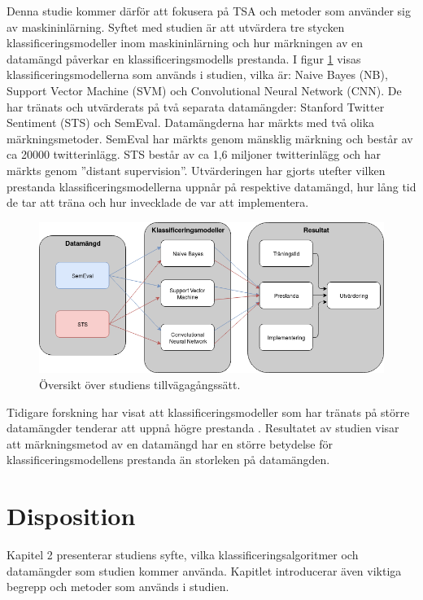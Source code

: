 \documentclass{kaumasters} %
\begin{document}
Denna studie kommer därför att fokusera på TSA och metoder som använder sig av maskininlärning. Syftet med studien är att utvärdera tre stycken klassificeringsmodeller inom maskininlärning och hur märkningen av en datamängd påverkar en klassificeringsmodells prestanda. I figur \ref{fig:helhet} visas klassificeringsmodellerna som används i studien, vilka är: Naive Bayes (NB), Support Vector Machine (SVM) och Convolutional Neural Network (CNN). De har tränats och utvärderats på två separata datamängder: Stanford Twitter Sentiment (STS) och SemEval. Datamängderna har märkts med två olika märkningsmetoder. SemEval har märkts genom mänsklig märkning och består av ca 20000 twitterinlägg. STS består av ca 1,6 miljoner twitterinlägg och har märkts genom ''distant supervision''. Utvärderingen har gjorts utefter vilken prestanda klassificeringsmodellerna uppnår på respektive datamängd, hur lång tid de tar att träna och hur invecklade de var att implementera. 

\begin{figure}[h]
\includegraphics[width=14cm]{helthetsbild}
\centering
\caption{Översikt över studiens tillvägagångssätt.}
\label{fig:helhet}
\end{figure}

Tidigare forskning har visat att klassificeringsmodeller som har tränats på större datamängder tenderar att uppnå högre prestanda \cite{TSAsurvey}. Resultatet av studien visar att märkningsmetod av en datamängd har en större betydelse för klassificeringsmodellens prestanda än storleken på datamängden.

\section*{Disposition} \label{int:dis} 
Kapitel 2 presenterar studiens syfte, vilka klassificeringsalgoritmer och datamängder som studien kommer använda. Kapitlet introducerar även viktiga begrepp och metoder som används i studien.
\end{document}
